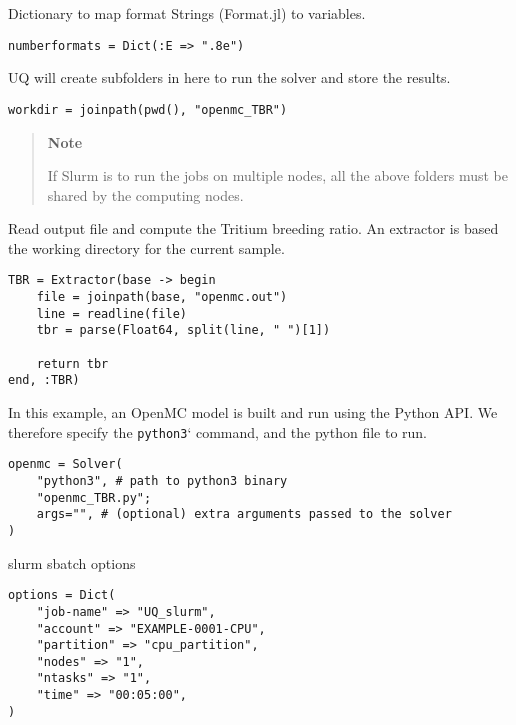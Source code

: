 Dictionary to map format Strings (Format.jl) to variables.




\begin{verbatim}
numberformats = Dict(:E => ".8e")
\end{verbatim}



UQ will create subfolders in here to run the solver and store the results.




\begin{verbatim}
workdir = joinpath(pwd(), "openmc_TBR")
\end{verbatim}



\begin{quote}
\textbf{Note}

If Slurm is to run the jobs on multiple nodes, all the above folders must be shared by the computing nodes.

\end{quote}


Read output file and compute the Tritium breeding ratio. An extractor is based the working directory for the current sample.




\begin{verbatim}
TBR = Extractor(base -> begin
    file = joinpath(base, "openmc.out")
    line = readline(file)
    tbr = parse(Float64, split(line, " ")[1])

    return tbr
end, :TBR)
\end{verbatim}



In this example, an OpenMC model is built and run using the Python API. We therefore specify the \texttt{python3}` command, and the python file to run.




\begin{verbatim}
openmc = Solver(
    "python3", # path to python3 binary
    "openmc_TBR.py";
    args="", # (optional) extra arguments passed to the solver
)
\end{verbatim}



slurm  sbatch options




\begin{verbatim}
options = Dict(
    "job-name" => "UQ_slurm",
    "account" => "EXAMPLE-0001-CPU",
    "partition" => "cpu_partition",
    "nodes" => "1",
    "ntasks" => "1",
    "time" => "00:05:00",
)
\end{verbatim}



